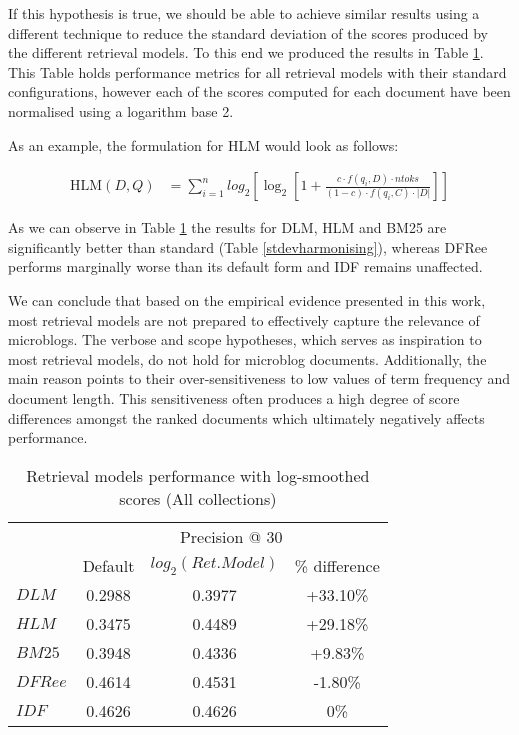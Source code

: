 If this hypothesis is true, we should be able to achieve similar results using a different technique to reduce the standard deviation of the scores produced by the different retrieval models. To this end we produced the results in Table \ref{loggedRMS}. This Table holds performance metrics for all retrieval models with their standard configurations, however each of the scores computed for each document have been normalised using a logarithm base 2.

As an example, the formulation for HLM would look as follows: 

\begin{small}
	\begin{align}
	\label{hlmformulalog}
	\text{HLM}(D,Q) &=  \sum_{i=1}^{n} log_2 \left[ \log_2 \left[ 1 + \frac{c \cdot f(q_i, D) \cdot ntoks }{ (1-c) \cdot f(q_i, C) \cdot |D|} \right] \right]
	\end{align}
\end{small}

As we can observe in Table \ref{loggedRMS} the results for DLM, HLM and BM25 are significantly better than standard (Table \ref{stdevharmonising}), whereas DFRee performs marginally worse than its default form and IDF remains unaffected. 

We can conclude that based on the empirical evidence presented in this work, most retrieval models are not prepared to effectively capture the relevance of microblogs. The verbose and scope hypotheses, which serves as inspiration to most retrieval models, do not hold for microblog documents. Additionally, the main reason points to their over-sensitiveness to low values of term frequency and document length. This sensitiveness often produces a high degree of score differences amongst the ranked documents which ultimately negatively affects performance.

\begin{table}[]
	
	\caption{Retrieval models performance with log-smoothed scores (All collections)} 
	\centering
	\begin{tabular}{l|c|c|c|} 
		
		\multicolumn{1}{c}{}&\multicolumn{3}{|c|}{Precision @ 30} \\ 
		\cline{2- 4}
		
			& Default & $log_2(Ret. Model)$ & \% difference \\
		\hline
					 
		$DLM$ & 0.2988 & 0.3977 & +33.10\% \\
		$HLM$ & 0.3475 & 0.4489 & +29.18\%\\
		$BM25$ & 0.3948 & 0.4336 & +9.83\%\\
		$DFRee$ & 0.4614 & 0.4531 & -1.80\%\\
		$IDF$ & 0.4626 & 0.4626 & 0\%\\
		\hline
	\end{tabular}
	\label{loggedRMS}
\end{table}

